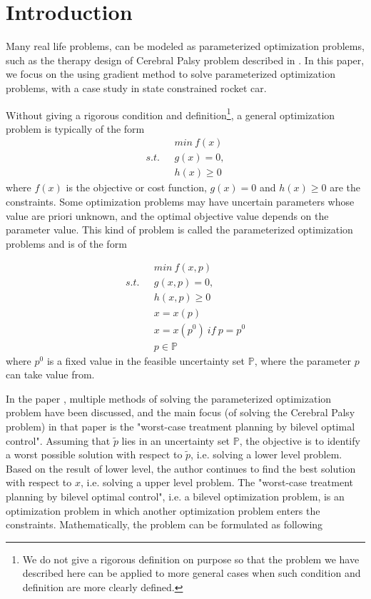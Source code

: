 

\chapter{Introduction}

Many real life problems, can be modeled as parameterized optimization problems, such as the therapy design of Cerebral Palsy problem described in \cite{MatSch22}. In this paper, we focus on the using gradient method to solve parameterized optimization problems, with a case study in state constrained rocket car. 

Without giving a rigorous condition and definition\footnote{We do not give a rigorous definition on purpose so that the problem we have described here can be applied to more general cases when such condition and definition are more clearly defined.},  a general optimization problem is typically of the form
\begin{equation}
	\begin{aligned}
		 \  \  \ & min \  f(x) \\
		s.t.  \  \  \ & g(x) = 0, \\ 
		              &  h(x)  \geq  0 
	\end{aligned}
    \label{GeneralMin}
\end{equation}
where $f(x)$ is the objective or cost function, $g(x) = 0$ and $h(x)  \geq  0$ are the constraints. Some optimization problems may have uncertain parameters whose value are priori unknown, and the optimal objective value depends on the parameter value. This kind of problem is called the parameterized optimization problems and is of the form 


\begin{equation}
	\begin{aligned}
		\  \  \ & min \  f(x, p) \\
		s.t.  \  \  \ & g(x, p) = 0, \\ 
		&  h(x,p)  \geq  0  \\ 
		& x = x(p) \\
		& x = x(p^0) \  if \  p = p^0 \\
		& p \in \mathbb{P}		
	\end{aligned}
    \label{ParaMin}
\end{equation}
where $p^0$ is a fixed value in the feasible uncertainty set $\mathbb{P}$, where the parameter $p$ can take value from.

In the paper \cite{MatSch22}, multiple methods of solving the parameterized optimization problem have been discussed, and the main focus (of solving the  Cerebral Palsy problem) in that paper is the "worst-case treatment planning by bilevel optimal control". Assuming that $\tilde{p}$ lies in an uncertainty set $\mathbb{P}$, the objective is to identify a worst possible solution with respect to $\tilde{p}$, i.e. solving a lower level problem. Based on the result of lower level, the author continues to find the best solution with respect to $x$, i.e. solving a upper level problem. The "worst-case treatment planning by bilevel optimal control", i.e. a  bilevel optimization problem, is an optimization problem in which another optimization problem enters the constraints. Mathematically, the problem can be formulated as following


